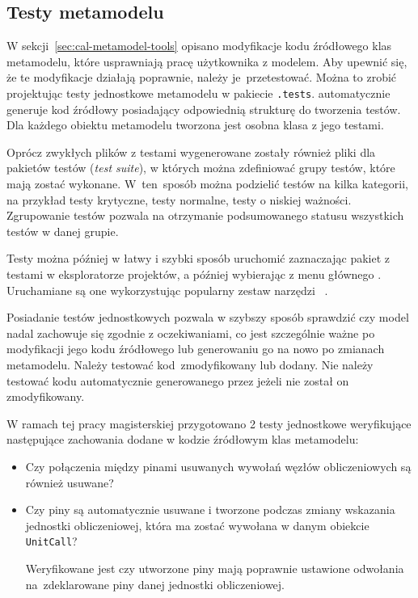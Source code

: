 \subsection{Testy metamodelu}\label{sec:testy-metamodelu}

W sekcji~\ref{sec:cal-metamodel-tools} opisano modyfikacje kodu źródłowego klas
metamodelu, które usprawniają pracę użytkownika z modelem. Aby upewnić się, że
te modyfikacje działają poprawnie, należy je~przetestować. Można to zrobić
projektując testy
jednostkowe metamodelu w pakiecie \texttt{.tests}. \SiriusDesktop{}
automatycznie generuje kod źródłowy posiadający odpowiednią strukturę do
tworzenia testów. Dla każdego obiektu metamodelu tworzona jest osobna klasa z
jego testami.

Oprócz zwykłych plików z testami wygenerowane zostały również pliki dla
pakietów testów (\emph{test suite}), w których można
zdefiniować grupy testów,
które mają zostać wykonane. W~ten~sposób można podzielić testów na kilka
kategorii, na przykład testy krytyczne, testy normalne, testy o niskiej
ważności. Zgrupowanie testów pozwala na otrzymanie podsumowanego statusu
wszystkich testów w danej grupie.

Testy można później w łatwy i szybki sposób uruchomić zaznaczając pakiet z
testami w eksploratorze projektów, a później wybierając z menu głównego
. Uruchamiane są one wykorzystując popularny
zestaw narzędzi \JUnit{}~\cite{junit-test-tutorial}.

Posiadanie testów jednostkowych pozwala w szybszy sposób sprawdzić czy model
nadal zachowuje się zgodnie z oczekiwaniami, co jest szczególnie ważne po
modyfikacji jego kodu źródłowego lub generowaniu go na nowo po zmianach
metamodelu. Należy testować kod~zmodyfikowany lub dodany. Nie należy testować
kodu automatycznie generowanego przez \SiriusDesktop{} jeżeli nie został
on zmodyfikowany.

W ramach tej pracy magisterskiej przygotowano 2 testy jednostkowe weryfikujące
następujące zachowania dodane w kodzie źródłowym klas metamodelu:

\begin{itemize}
	\item Czy połączenia między pinami usuwanych wywołań węzłów obliczeniowych są również usuwane?

	\item Czy piny są automatycznie usuwane i tworzone podczas zmiany wskazania jednostki obliczeniowej, która ma zostać wywołana w danym obiekcie \texttt{UnitCall}?

	      Weryfikowane jest czy utworzone piny mają poprawnie ustawione odwołania na~zdeklarowane piny danej jednostki obliczeniowej.
\end{itemize}

